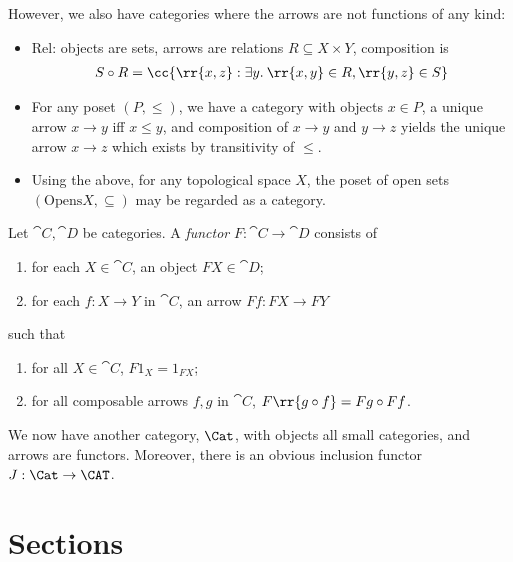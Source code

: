 \documentclass{article}
\begin{document}
\begin{example}
  However, we also have categories where the arrows are not functions of any kind:
  \begin{itemize}
    \item $\text{Rel}$: objects are sets, arrows are relations $R\subseteq X\times Y$,
      composition is
      \begin{align*}
        S\circ R=\cc{\rr{x,z} : \exists y.\:\rr{x,y}\in R,\rr{y,z}\in S}
      \end{align*}
    \item For any poset $(P,\leq)$, we have a category with objects $x\in P$,
      a unique arrow $x\to y$ iff $x\leq y$, and composition of $x\to y$ and
      $y\to z$ yields the unique arrow $x\to z$ which exists by transitivity
      of $\leq$.
    \item Using the above, for any topological space $X$, the poset of open sets
      $(\text{Opens}X, \subseteq)$ may be regarded as a category.
  \end{itemize}
\end{example}

\begin{definition}\label{def:functor}
  Let $\cat{C},\cat{D}$ be categories. A \emph{functor} $F:\cat{C}\to\cat{D}$
  consists of
  \begin{enumerate}
    \item for each $X\in\cat{C}$, an object $FX\in\cat{D}$;
    \item for each $f:X\to Y$ in $\cat{C}$, an arrow $Ff:FX\to FY$
  \end{enumerate}
  such that
  \begin{enumerate}
    \item for all $X\in\cat{C}$, $F1_X=1_{FX}$;
    \item for all composable arrows $f,g$ in $\cat{C}$, $F\rr{g\circ f}=Fg\circ Ff$.
  \end{enumerate}
\end{definition}

\begin{example}
  We now have another category, $\Cat$, with objects all small categories, and
  arrows are functors. Moreover, there is an obvious inclusion functor
  $J:\Cat\to\CAT$.
\end{example}


\section{Sections}\label{sec:sections}
\end{document}
